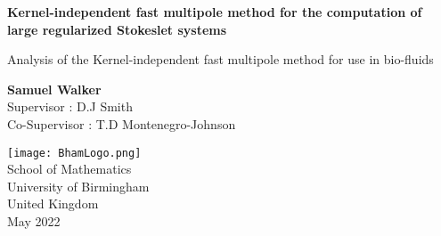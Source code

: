 \begin{titlepage}
    \begin{center}
        \vspace*{1cm}

        \LARGE
        \textbf{Kernel-independent fast multipole method for the computation of large regularized Stokeslet systems}

        \normalsize
        \vspace{0.5cm}
        Analysis of the Kernel-independent fast multipole method for use in bio-fluids
        
        \vspace{1.5cm}
        
        \textbf{Samuel Walker}\\
        Supervisor : D.J Smith \\
        Co-Supervisor : T.D Montenegro-Johnson
        
        \vfill
        
        \vspace{0.8cm}
        
        \texttt{[image: BhamLogo.png]}\\
        
        \normalsize
        School of Mathematics\\
        University of Birmingham\\
        United Kingdom\\
        May 2022
            
    \end{center}
\end{titlepage}



